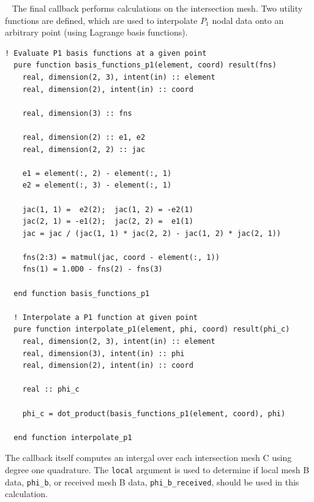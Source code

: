 \documentclass{article}
\begin{document}
~\newline
The final callback performs calculations on the intersection mesh. Two utility
functions are defined, which are used to interpolate $P_1$ nodal data onto an
arbitrary point (using Lagrange basis functions).
\begin{lstlisting}[language=FORTRAN] 
  ! Evaluate P1 basis functions at a given point
  pure function basis_functions_p1(element, coord) result(fns)
    real, dimension(2, 3), intent(in) :: element
    real, dimension(2), intent(in) :: coord

    real, dimension(3) :: fns

    real, dimension(2) :: e1, e2
    real, dimension(2, 2) :: jac
        
    e1 = element(:, 2) - element(:, 1)
    e2 = element(:, 3) - element(:, 1)

    jac(1, 1) =  e2(2);  jac(1, 2) = -e2(1)
    jac(2, 1) = -e1(2);  jac(2, 2) =  e1(1)
    jac = jac / (jac(1, 1) * jac(2, 2) - jac(1, 2) * jac(2, 1))

    fns(2:3) = matmul(jac, coord - element(:, 1))
    fns(1) = 1.0D0 - fns(2) - fns(3)

  end function basis_functions_p1

  ! Interpolate a P1 function at given point
  pure function interpolate_p1(element, phi, coord) result(phi_c)
    real, dimension(2, 3), intent(in) :: element
    real, dimension(3), intent(in) :: phi
    real, dimension(2), intent(in) :: coord

    real :: phi_c

    phi_c = dot_product(basis_functions_p1(element, coord), phi)

  end function interpolate_p1
\end{lstlisting}
The callback itself computes an intergal over each intersection mesh C using
degree one quadrature. The \verb+local+ argument is used to determine if local
mesh B data, \verb+phi_b+, or received mesh B data,
\verb+phi_b_received+, should be used in this calculation.
\end{document}
